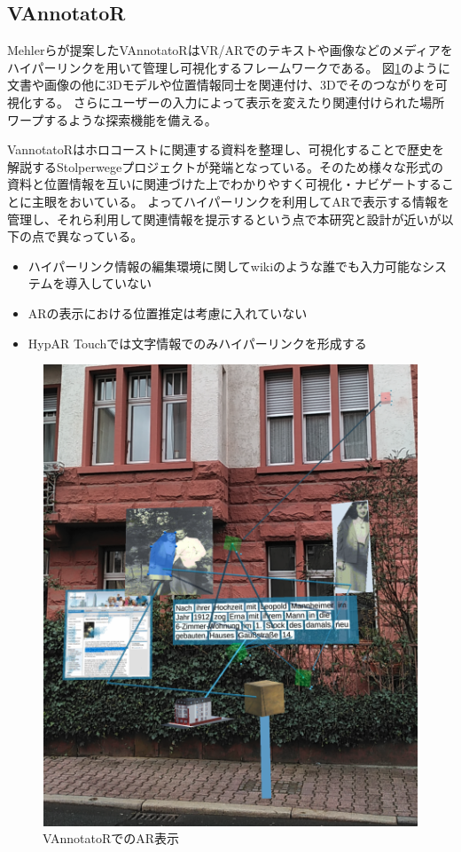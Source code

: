 \subsection{VAnnotatoR}
Mehlerらが提案したVAnnotatoR\cite{10.1145/3209542.3209572}はVR/ARでのテキストや画像などのメディアをハイパーリンクを用いて管理し可視化するフレームワークである。
図\ref{fig:VAnnotatoR}のように文書や画像の他に3Dモデルや位置情報同士を関連付け、3Dでそのつながりを可視化する。
さらにユーザーの入力によって表示を変えたり関連付けられた場所ワープするような探索機能を備える。

VannotatoRはホロコーストに関連する資料を整理し、可視化することで歴史を解説するStolperwegeプロジェクトが発端となっている。そのため様々な形式の資料と位置情報を互いに関連づけた上でわかりやすく可視化・ナビゲートすることに主眼をおいている。
よってハイパーリンクを利用してARで表示する情報を管理し、それら利用して関連情報を提示するという点で本研究と設計が近いが以下の点で異なっている。
\begin{itemize} 
  \item ハイパーリンク情報の編集環境に関してwikiのような誰でも入力可能なシステムを導入していない
  \item ARの表示における位置推定は考慮に入れていない
  \item HypAR Touchでは文字情報でのみハイパーリンクを形成する
\end{itemize}

\begin{figure}[h]
  \centering 
  \includegraphics[width=150mm]{images/VAnnotatoR.png}
  \caption{VAnnotatoRでのAR表示} \label{fig:VAnnotatoR}
\end{figure}

